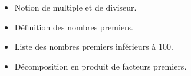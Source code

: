 \begin{prerequis}[Prérequis]    
    \begin{itemize}
        \item Notion de multiple et de diviseur.
        \item Définition des nombres premiers.
        \item Liste des nombres premiers inférieurs à $100$.
        \item Décomposition en produit de facteurs premiers.
    \end{itemize}
\end{prerequis}
